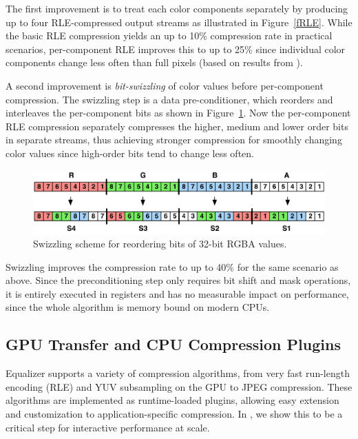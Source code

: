 The first improvement is to treat each color components separately by producing
up to four RLE-compressed output streams as illustrated in Figure~\ref{fRLE}.
While the basic RLE compression yields an up to 10\% compression rate in
practical scenarios, per-component RLE improves this to up to 25\% since
individual color components change less often than full pixels (based on results
from \cite{MEP:10}).


A second improvement is {\em bit-swizzling} of color values before per-component
compression. The swizzling step is a data pre-conditioner, which reorders and
interleaves the per-component bits as shown in Figure~\ref{fSwizzle}. Now the
per-component RLE compression separately compresses the higher, medium and lower
order bits in separate streams, thus achieving stronger compression for smoothly
changing color values since high-order bits tend to change less often.

\begin{figure}[h!t]
  \centering
  \includegraphics[scale=0.18]{images/swizzle}
  \caption{Swizzling scheme for reordering bits of 32-bit RGBA values.}
  \label{fSwizzle}
\end{figure}

Swizzling improves the compression rate to up to 40\% for the same scenario as
above. Since the preconditioning step only requires bit shift and mask
operations, it is entirely executed in registers and has no measurable
impact on performance, since the whole algorithm is memory bound on modern CPUs.



\subsection{GPU Transfer and CPU Compression Plugins}
 \textsf{Equalizer} supports a variety of compression
algorithms, from very fast run-length encoding (RLE) and YUV subsampling on the GPU to JPEG
compression. These algorithms are implemented as runtime-loaded plugins,
allowing easy extension and customization to application-specific compression.
In \cite{MEP:10}, we show this to be a critical step for interactive performance
at scale.


